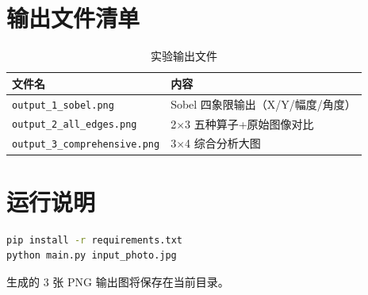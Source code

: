 \documentclass[12pt,a4paper]{ctexart}
\begin{document}


\section{输出文件清单}

\begin{table}[H]
    \centering
    \caption{实验输出文件}
    \begin{tabular}{ll}
        \toprule
        \textbf{文件名} & \textbf{内容} \\
        \midrule
        \texttt{output\_1\_sobel.png} & Sobel 四象限输出（X/Y/幅度/角度） \\
        \texttt{output\_2\_all\_edges.png} & 2$\times$3 五种算子+原始图像对比 \\
        \texttt{output\_3\_comprehensive.png} & 3$\times$4 综合分析大图 \\
        \bottomrule
    \end{tabular}
\end{table}

\section{运行说明}

\begin{lstlisting}[language=bash, caption={运行命令}]
pip install -r requirements.txt
python main.py input_photo.jpg
\end{lstlisting}

生成的 3 张 PNG 输出图将保存在当前目录。
\end{document}
